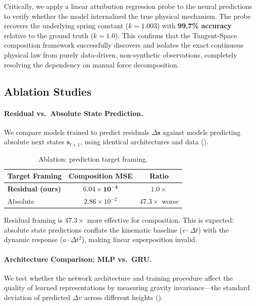 \documentclass[twoside,11pt]{article}
\begin{document}
Critically, we apply a linear attribution regression probe to the neural predictions to verify whether the model internalized the true physical mechanism. The probe recovers the underlying spring constant ($k=1.003$) with \textbf{99.7\% accuracy} relative to the ground truth ($k=1.0$). This confirms that the Tangent-Space composition framework successfully discovers and isolates the exact continuous physical law from purely data-driven, non-synthetic observations, completely resolving the dependency on manual force decomposition.

\subsection{Ablation Studies}

\paragraph{Residual vs.\ Absolute State Prediction.}
We compare models trained to predict residuals $\Delta\mathbf{s}$ against models predicting absolute next states $\mathbf{s}_{t+1}$, using identical architectures and data ().

\begin{table}[h]
\centering
\caption{Ablation: prediction target framing.}
\label{tab:ablation}
\begin{tabular}{@{}lcc@{}}
\toprule
Target Framing & Composition MSE & Ratio \\
\midrule
\textbf{Residual (ours)} & $\mathbf{6.04 \times 10^{-4}}$ & $\mathbf{1.0\times}$ \\
Absolute & $2.86 \times 10^{-2}$ & $47.3\times$ worse \\
\bottomrule
\end{tabular}
\end{table}

Residual framing is $47.3\times$ more effective for composition. This is expected: absolute state predictions conflate the kinematic baseline ($v \cdot \Delta t$) with the dynamic response ($a \cdot \Delta t^2$), making linear superposition invalid.

\paragraph{Architecture Comparison: MLP vs.\ GRU.}
We test whether the network architecture and training procedure affect the quality of learned representations by measuring gravity invariance---the standard deviation of predicted $\Delta v$ across different heights ().
\end{document}
